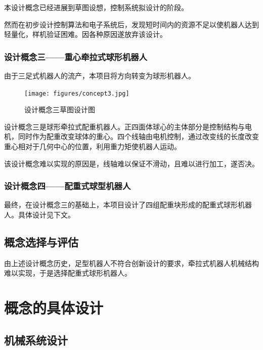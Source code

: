 \documentclass[a4paper]{ctexart}
\numberwithin{equation}{section}
\numberwithin{table}{section}
\numberwithin{figure}{section}
\begin{document}
本设计概念已经进展到草图设想，控制系统拟设计的阶段。

然而在初步设计控制算法和电子系统后，发现短时间内的资源不足以使机器人达到轻量化，样机验证困难。因各种原因遂放弃该设计。

\subsubsection{设计概念三——重心牵拉式球形机器人}

由于三足式机器人的流产，本项目将方向转变为球形机器人。

\begin{figure}[H]
  \begin{center}
    \texttt{[image: figures/concept3.jpg]}
  \end{center}
  \label{fig_concept_3}
  \caption{设计概念三草图设计图}
\end{figure}

设计概念三是球形牵拉式配重机器人。正四面体球心的主体部分是控制结构与电机，同时作为配重改变球体的重心。四个线轴由电机控制，通过改变线的长度改变重心相对于几何中心的位置，利用重力矩使机器人运动。

该设计概念难以实现的原因是，线轴难以保证不滑动，且难以进行加工，遂否决。


\subsubsection{设计概念四——配重式球型机器人}

最终，在设计概念三的基础上，本项目设计了四组配重块形成的配重式球形机器人。具体设计见下文。

\subsection{概念选择与评估}

由上述设计概念历史，足型机器人不符合创新设计的要求，牵拉式机器人机械结构难以实现，于是选择配重式球形机器人。


\section{概念的具体设计}

\subsection{机械系统设计}
\end{document}
